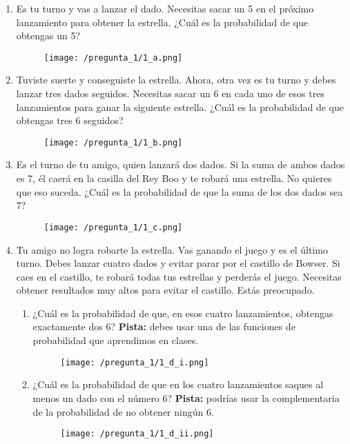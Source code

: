 \documentclass[a4paper]{article}
\begin{document}
\begin{enumerate}[label=\alph*.]
	\item Es tu turno y vas a lanzar el dado. Necesitas sacar un 5 en el próximo lanzamiento para obtener la estrella. ¿Cuál es la probabilidad de que obtengas un 5?
		\begin{figure}[H]
			\centering
			\texttt{[image: /pregunta\_1/1\_a.png]}
		\end{figure}
	\item Tuviste suerte y conseguiste la estrella. Ahora, otra vez es tu turno y debes lanzar tres dados seguidos. Necesitas sacar un 6 en cada uno de esos tres lanzamientos para ganar la siguiente estrella. ¿Cuál es la probabilidad de que obtengas tres 6 seguidos?
		\begin{figure}[H]
		\centering
		\texttt{[image: /pregunta\_1/1\_b.png]}
		\end{figure}
	\item Es el turno de tu amigo, quien lanzará dos dados. Si la suma de ambos dados es 7, él caerá en la casilla del Rey Boo y te robará una estrella. No quieres que eso suceda. ¿Cuál es la probabilidad de que la suma de los dos dados sea 7?
		\begin{figure}[H]
		\centering
		\texttt{[image: /pregunta\_1/1\_c.png]}
		\end{figure}
	\item Tu amigo no logra robarte la estrella. Vas ganando el juego y es el último turno. Debes lanzar cuatro dados y evitar parar por el castillo de Bowser. Si caes en el castillo, te robará todas tus estrellas y perderás el juego. Necesitas obtener resultados muy altos para evitar el castillo. Estás preocupado.
	\begin{enumerate}[label=\roman*.]
		\item ¿Cuál es la probabilidad de que, en esos cuatro lanzamientos, obtengas exactamente dos 6? \textbf{Pista:} debes usar una de las funciones de probabilidad que aprendimos en clases.
		\begin{figure}[H]
			\texttt{[image: /pregunta\_1/1\_d\_i.png]}
		\end{figure}
		\item ¿Cuál es la probabilidad de que en los cuatro lanzamientos saques al menos un dado con el número 6? \textbf{Pista:} podrías usar la complementaria de la probabilidad de no obtener ningún 6.
		\begin{figure}[H]
			\texttt{[image: /pregunta\_1/1\_d\_ii.png]}
		\end{figure}
	\end{enumerate}
\end{enumerate}
\end{document}
